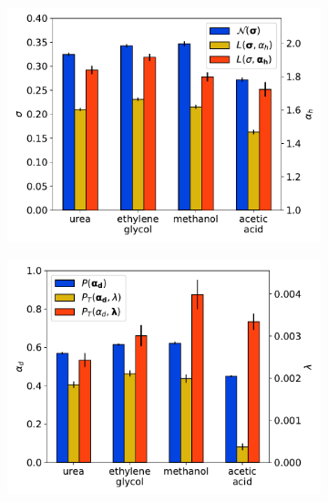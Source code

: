 \documentclass{article}
\begin{document}
  \begin{figure}
  \centering
  \begin{subfigure}{0.325\textwidth}
  \includegraphics[width=\textwidth]{1mode_AD_hops.pdf}
  \caption{}\label{fig:1mode_AD_hops}
  \end{subfigure}
  \begin{subfigure}{0.325\textwidth}
  \includegraphics[width=\textwidth]{1mode_AD_dwells.pdf}
  \caption{}\label{fig:1mode_AD_dwells}
  \end{subfigure}
  \begin{subfigure}{0.325\textwidth}

\end{subfigure}
\end{figure}
\end{document}
